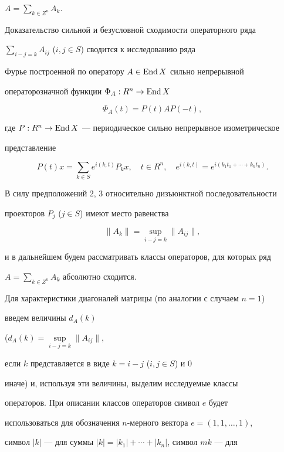 $A=\sum\limits_{k\in Z^n}A_k$.





Доказательство сильной и безусловной сходимости операторного ряда


$\sum\limits_{i-j=k}A_{ij}$ ($i,j\in S$) сводится к исследованию ряда


Фурье построенной по оператору $A\in \operatorname{End} X$ сильно непрерывной


операторозначной функции $\Phi_A:R^n\to \operatorname{End} X$


$$


\Phi_A(t)=P(t)AP(-t),


$$


где $P:R^n\to \operatorname{End} X$ --- периодическое сильно непрерывное изометрическое


представление


$$


P(t)x=\sum_{k\in S} e^{i(k,t)}P_k x,\quad


t\in R^n, \quad e^{i(k,t)}=e^{i(k_1t_1+\dotsb +k_nt_n)}.


$$





В силу предположений 2, 3 относительно дизъюнктной последовательности


проекторов $P_j$ ($j\in S$) имеют место равенства


$$


\|A_k\|=\sup_{i-j=k}\|A_{ij}\|,


$$


и в дальнейшем будем рассматривать классы операторов, для которых ряд


$A=\sum\limits_{k\in Z^n}A_k$ абсолютно сходится.





Для характеристики диагоналей матрицы (по аналогии с случаем $n=1$)


введем величины $d_A(k)$


($d_A(k)=\sup\limits_{i-j=k}\|A_{ij}\|$,


если $k$ представляется в виде $k=i-j$ ($i,j\in S$) и 0


иначе) и, используя эти величины, выделим исследуемые классы


операторов. При описании классов операторов символ $e$ будет


использоваться для обозначения $n$-мерного вектора $e=(1,1,\dotsc,1)$,


символ $|k|$ --- для суммы $|k|=|k_1|+\dotsb +|k_n|$, символ $mk$ --- для


